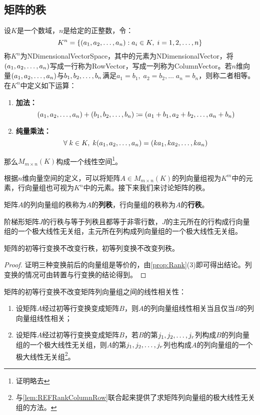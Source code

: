 \subsection{矩阵的秩}
\begin{definition}
	设$K$是一个数域，$n$是给定的正整数，令：
	\begin{equation*}
		K^n=\{(a_1, a_2, \dots, a_{n}):a_i\in K,\;i=1,2,\dots,n\}
	\end{equation*}
	称$K^n$为\gls{NDimensionalVectorSpace}，其中的元素为\gls{NDimensionalVector}，将$(a_1, a_2, \dots, a_{n})$写成一行称为\gls{RowVector}，写成一列称为\gls{ColumnVector}。若$n$维向量$(a_1, a_2, \dots, a_{n})$与$b_1, b_2, \dots, b_{n}$满足$a_1=b_1,\;a_2=b_2,\dots\;a_n=b_n$，则称二者相等。在$K^n$中定义如下运算：
	\begin{enumerate}
		\item \textbf{加法：} 
		\begin{equation*}
			(a_1, a_2, \dots, a_{n})+(b_1, b_2, \dots, b_{n})\coloneq(a_1+b_1,a_2+b_2,\dots,a_n+b_n)
		\end{equation*}
		\item \textbf{纯量乘法：}
		\begin{equation*}
			\forall\;k\in K,\; k(a_1, a_2, \dots, a_{n})=(ka_1, ka_2, \dots, ka_{n})
		\end{equation*}
	\end{enumerate}
	那么$M_{m\times n}(K)$构成一个线性空间\footnote{证明略去}。
\end{definition}
根据$n$维向量空间的定义，可以将矩阵$A\in M_{m\times n}(K)$的列向量组视为$K^m$中的元素，行向量组也可视为$K^n$中的元素。接下来我们来讨论矩阵的秩。
\begin{definition}
	矩阵$A$的列向量组的秩称为$A$的\textbf{列秩}，行向量组的秩称为$A$的\textbf{行秩}。
\end{definition}
\begin{lemma}\label{lem:REFRankColumnRow}
	阶梯形矩阵$J$的行秩与等于列秩且都等于非零行数，$J$的主元所在的行构成行向量组的一个极大线性无关组，主元所在列构成列向量组的一个极大线性无关组。
\end{lemma}
\begin{lemma}\label{lem:ElementaryRowColumnTransRank}
	矩阵的初等行变换不改变行秩，初等列变换不改变列秩。
\end{lemma}
\begin{proof}
	证明三种变换前后的向量组是等价的，由\cref{prop:Rank}(3)即可得出结论。列变换的情况可由转置与行变换的结论得到。
\end{proof}
\begin{lemma}\label{lem:ElementaryRowSameColumn}
	矩阵的初等行变换不改变矩阵列向量组之间的线性相关性：
	\begin{enumerate}
		\item 设矩阵$A$经过初等行变换变成矩阵$B$，则$A$的列向量组线性相关当且仅当$B$的列向量组线性相关；
		\item 设矩阵$A$经过初等行变换变成矩阵$B$，若$B$的第$j_1, j_2, \dots, j_{r}$列构成$B$的列向量组的一个极大线性无关组，则$A$的第$j_1, j_2, \dots, j_{r}$列也构成$A$的列向量组的一个极大线性无关组\footnote{与\cref{lem:REFRankColumnRow}联合起来提供了求矩阵列向量组的极大线性无关组的方法。}。
	\end{enumerate}
\end{lemma}
